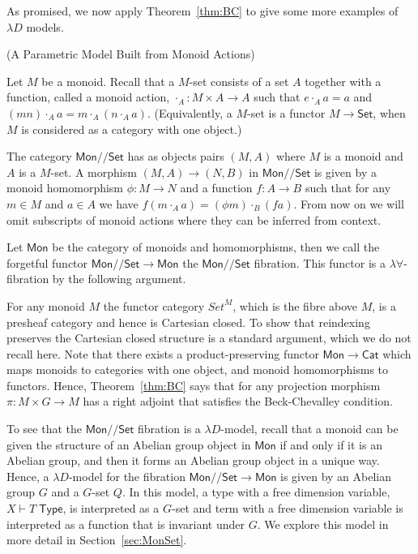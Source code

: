 \documentclass[a4paper,UKenglish]{lipics}
\newcommand{\msf}[1]{\mathsf{#1}} %
\newcommand{\Mon}{\msf{Mon}}
\newcommand{\Set}{\msf{Set}}
\newcommand{\Cat}{\msf{Cat}}
\newcommand{\GroupSet}[1]{#1/\!/\Set}
\newcommand{\MonSet}{\GroupSet{\Mon}}
\newcommand{\Tj}[2]{#1 \vdash #2 \; \msf{ Type}}
\newcommand{\Dvar}{X}
\begin{document}
As promised, we now apply Theorem~\ref{thm:BC} to give some more examples of $\lambda D$ models. 

\begin{example}(A Parametric Model Built from Monoid Actions)
\label{ex:MonAct}

Let $M$ be a monoid. Recall that a $M$-set consists of a set $A$ together with a function, called a monoid action, $\cdot_A:M\times A\to A$ such that $e\cdot_{A} a=a$ and $(mn)\cdot_A a=m\cdot_A (n\cdot_A a)$. (Equivalently, a $M$-set is a functor $M\to\Set$, when $M$ is considered as a category with one object.)

The category $\MonSet$ has as objects pairs $(M,A)$ where $M$ is a monoid and $A$ is a $M$-set. A morphism $(M,A) \rightarrow (N,B)$ in $\MonSet$ is given by a monoid homomorphism $\phi:M\rightarrow N$ and a function $f:A \rightarrow B$ such that for any $m\in M$ and $a\in A$ we have $f (m\cdot_A a) = (\phi m)\cdot_B (f a)$. From now on we will omit subscripts of monoid actions where they can be inferred from context.

Let $\Mon$ be the category of monoids and homomorphisms, then we call the forgetful functor $\MonSet\to \Mon$ the $\MonSet$ fibration. This functor is a $\lambda\forall$-fibration by the following argument.

For any monoid $M$ the functor category ${Set}^M$, which is the fibre above $M$, is a presheaf category and hence is Cartesian closed. To show that reindexing preserves the Cartesian closed structure is a standard argument, which we do not recall here. Note that there exists a product-preserving functor $\Mon \rightarrow \Cat$ which maps monoids to categories with one object, and monoid homomorphisms to functors. Hence, Theorem~\ref{thm:BC} says that for any projection morphism $\pi : M \times G \rightarrow M$ has a right adjoint that satisfies the Beck-Chevalley condition. 

To see that the $\MonSet$ fibration is a $\lambda D$-model, recall that a monoid can be given the structure of an Abelian group object in $\Mon$ if and only if it is an Abelian group, and then it forms an Abelian group object in a unique way. Hence, a $\lambda D$-model for the fibration $\MonSet\to\Mon$ is given by an Abelian group $G$ and a $G$-set $Q$. In this model, a type with a free dimension variable, $\Tj\Dvar T$, is interpreted as a $G$-set and term with a free dimension variable is interpreted as a function that is invariant under $G$. We explore this model in more detail in Section~\ref{sec:MonSet}.
\end{example}
\end{document}
